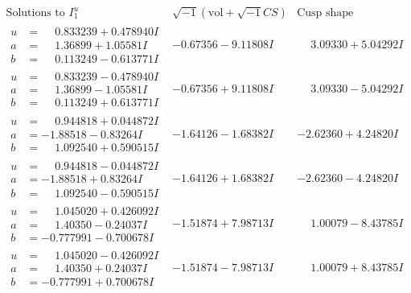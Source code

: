 \documentclass[1p]{elsarticle_modified}
\theoremstyle{definition}
\newcommand{\I}{\sqrt{-1}}
\begin{document}
$$\begin{array}{c|c|c}  
\text{Solutions to }I^u_{1}& \I (\text{vol} + \sqrt{-1}CS) & \text{Cusp shape}\\
 \hline 
\begin{aligned}
u &= \phantom{-}0.833239 + 0.478940 I \\
a &= \phantom{-}1.36899 + 1.05581 I \\
b &= \phantom{-}0.113249 - 0.613771 I\end{aligned}
 & -0.67356 - 9.11808 I & \phantom{-}3.09330 + 5.04292 I \\ \hline\begin{aligned}
u &= \phantom{-}0.833239 - 0.478940 I \\
a &= \phantom{-}1.36899 - 1.05581 I \\
b &= \phantom{-}0.113249 + 0.613771 I\end{aligned}
 & -0.67356 + 9.11808 I & \phantom{-}3.09330 - 5.04292 I \\ \hline\begin{aligned}
u &= \phantom{-}0.944818 + 0.044872 I \\
a &= -1.88518 - 0.83264 I \\
b &= \phantom{-}1.092540 + 0.590515 I\end{aligned}
 & -1.64126 - 1.68382 I & -2.62360 + 4.24820 I \\ \hline\begin{aligned}
u &= \phantom{-}0.944818 - 0.044872 I \\
a &= -1.88518 + 0.83264 I \\
b &= \phantom{-}1.092540 - 0.590515 I\end{aligned}
 & -1.64126 + 1.68382 I & -2.62360 - 4.24820 I \\ \hline\begin{aligned}
u &= \phantom{-}1.045020 + 0.426092 I \\
a &= \phantom{-}1.40350 - 0.24037 I \\
b &= -0.777991 - 0.700678 I\end{aligned}
 & -1.51874 + 7.98713 I & \phantom{-}1.00079 - 8.43785 I \\ \hline\begin{aligned}
u &= \phantom{-}1.045020 - 0.426092 I \\
a &= \phantom{-}1.40350 + 0.24037 I \\
b &= -0.777991 + 0.700678 I\end{aligned}
 & -1.51874 - 7.98713 I & \phantom{-}1.00079 + 8.43785 I \\ \hline\begin{aligned}

\end{aligned}
\end{array}$$
\end{document}
